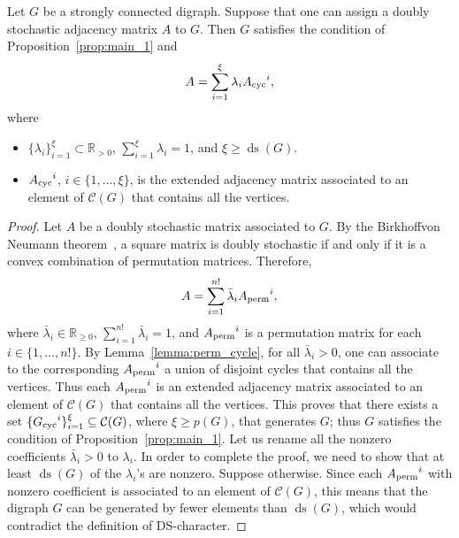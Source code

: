 \documentclass[final]{siamltex}
\begin{document}
\begin{proposition}\label{prop:dsable}
  Let $G$ be a strongly connected digraph. Suppose that one can assign
  a doubly stochastic adjacency matrix $ A$ to $G$. Then $ G $
  satisfies the condition of Proposition~\ref{prop:main_1} and
  \[
  A = \sum_{i=1}^{\xi}\lambda_i{{A}_{\textup{{cyc}}}}^i,
  \]
  where 
  \begin{itemize}
  \item $\{ \lambda_i \}_{i=1}^{\xi} \subset \mathbb{R}_{> 0}$, $
    \sum^{\xi}_{i=1}\lambda_i=1 $, and $ \xi \geq {\operatorname{ds}}(G) $.
  \item $ {{A}_{\textup{{cyc}}}}^i $, $ i\in\{1,\ldots,\xi\} $, is the
    extended adjacency matrix associated to an element of $
    \mathcal{C}(G) $ that contains all the vertices.
  \end{itemize}
\end{proposition}
\begin{proof}
  
  
  Let $A $ be a doubly stochastic matrix associated to $ G $. By the
  Birkhoff\textendash von Neumann theorem~\cite{GB:1946}, a square
  matrix is doubly stochastic if and only if it is a convex
  combination of permutation matrices. Therefore,
  \[
  A =\sum_{i=1}^{n!}\bar{\lambda}_i{{A}_{\textup{{perm}}}}^i,
  \]
  where $ \bar{\lambda}_i\in \mathbb{R}_{\geq0} $, $
  \sum_{i=1}^{n!}\bar{\lambda}_i=1 $, and $ {{A}_{\textup{{perm}}}}^i $ is a
  permutation matrix for each $ i \in\{1,\ldots, n!\} $.  By
  Lemma~\ref{lemma:perm_cycle}, for all $ \bar{\lambda}_i> 0 $, one
  can associate to the corresponding $ {{A}_{\textup{{perm}}}}^i $ a union of
  disjoint cycles that contains all the vertices. Thus each
  ${{A}_{\textup{{perm}}}}^i $ is an extended adjacency matrix associated to
  an element of $ \mathcal{C}(G) $ that contains all the vertices.
  This proves that there exists a set $
  \{{{G}_{\textup{{cyc}}}}^i\}_{i=1}^{\xi} \subseteq \mathcal{C}(G) $, where
  $ \xi \geq p(G) $, that generates $G$; thus $ G $ satisfies the
  condition of Proposition~\ref{prop:main_1}.  Let us rename all the
  nonzero coefficients $ \bar{\lambda}_i>0 $ to $ \lambda_i $. In
  order to complete the proof, we need to show that at least $ {\operatorname{ds}}(G)$
  of the $ \lambda_i $'s are nonzero. Suppose otherwise. Since each $
  {{A}_{\textup{{perm}}}}^i $ with nonzero coefficient is associated to an
  element of $ \mathcal{C}(G) $, this means that the digraph $ G $ can
  be generated by fewer elements than $ {\operatorname{ds}}(G) $, which would contradict
 the definition of DS-character.
\end{proof}
\end{document}
